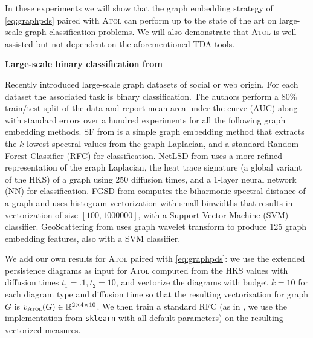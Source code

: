 \documentclass[noinfoline,preprint]{article}
\renewcommand{\1}{\mathds 1}
\begin{document}
In these experiments we will show that the graph embedding strategy of \eqref{eq:graphpds} paired with \textsc{Atol} can perform up to the state of the art on large-scale graph classification problems. We will also demonstrate that \textsc{Atol} is well assisted but not dependent on the aforementioned TDA tools.

\noindent
\textbf{Large-scale binary classification from \cite{rozemberczki2020api}}

Recently \cite{rozemberczki2020api} introduced large-scale graph datasets of social or web origin. For each dataset the associated task is binary classification. The authors perform a 80\% train/test split of the data and report mean area under the curve (AUC) along with standard errors over a hundred experiments for all the following graph embedding methods. SF from \cite{lara2018simple} is a simple graph embedding method that extracts the $k$ lowest spectral values from the graph Laplacian, and a standard Random Forest Classifier (RFC) for classification. NetLSD from \cite{tsitsulin2018} uses a more refined representation of the graph Laplacian, the heat trace signature (a global variant of the HKS) of a graph using 250 diffusion times, and a 1-layer neural network (NN) for classification. FGSD from \cite{verma2017hunt} computes the biharmonic spectral distance of a graph and uses histogram vectorization with small binwidths that results in vectorization of size $[100, 1000000]$, with a Support Vector Machine (SVM) classifier. GeoScattering from \cite{gao19} uses graph wavelet transform to produce 125 graph embedding features, also with a SVM classifier.

We add our own results for \textsc{Atol} paired with \eqref{eq:graphpds}: we use the extended persistence diagrams as input for \textsc{Atol} computed from the HKS values with diffusion times $t_1=.1, t_2=10$, and vectorize the diagrams with budget $k=10$ for each diagram type and diffusion time so that the resulting vectorization for graph $G$ is $v_{\textsc{Atol}}(G) \in \mathbb{R}^{2 \times 4 \times 10}$. We then train a standard RFC (as in \cite{lara2018simple}, we use the implementation from \texttt{sklearn} \cite{sklearn} with all default parameters) on the resulting vectorized measures.
\end{document}
